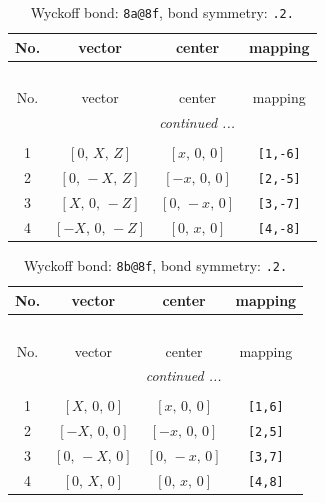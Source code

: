 \documentclass[fleqn,8pt]{jsarticle}
\begin{document}
\begin{longtable}{cccc}
\caption{Wyckoff bond: {\tt 8a@8f}, bond symmetry: {\tt .2.}}
 \\
 \hline \hline
No. & vector & center & mapping \\ \hline \endfirsthead

\multicolumn{3}{l}{\tablename\ \thetable{}} \\
 \hline \hline
No. & vector & center & mapping \\ \hline \endhead

 \hline \hline
\multicolumn{3}{r}{\footnotesize\it continued ...} \\ \endfoot

 \hline \hline
\multicolumn{3}{r}{} \\ \endlastfoot

1 & $\left[ 0,\, X,\, Z \right]$ & $\left[ x,\, 0,\, 0 \right]$ & {\tt [1,-6]} \\ \hline
2 & $\left[ 0,\, - X,\, Z \right]$ & $\left[ - x,\, 0,\, 0 \right]$ & {\tt [2,-5]} \\ \hline
3 & $\left[ X,\, 0,\, - Z \right]$ & $\left[ 0,\, - x,\, 0 \right]$ & {\tt [3,-7]} \\ \hline
4 & $\left[ - X,\, 0,\, - Z \right]$ & $\left[ 0,\, x,\, 0 \right]$ & {\tt [4,-8]} \\
\end{longtable}
\renewcommand{\arraystretch}{1.2}
\begin{longtable}{cccc}
\caption{Wyckoff bond: {\tt 8b@8f}, bond symmetry: {\tt .2.}}
 \\
 \hline \hline
No. & vector & center & mapping \\ \hline \endfirsthead

\multicolumn{3}{l}{\tablename\ \thetable{}} \\
 \hline \hline
No. & vector & center & mapping \\ \hline \endhead

 \hline \hline
\multicolumn{3}{r}{\footnotesize\it continued ...} \\ \endfoot

 \hline \hline
\multicolumn{3}{r}{} \\ \endlastfoot

1 & $\left[ X,\, 0,\, 0 \right]$ & $\left[ x,\, 0,\, 0 \right]$ & {\tt [1,6]} \\ \hline
2 & $\left[ - X,\, 0,\, 0 \right]$ & $\left[ - x,\, 0,\, 0 \right]$ & {\tt [2,5]} \\ \hline
3 & $\left[ 0,\, - X,\, 0 \right]$ & $\left[ 0,\, - x,\, 0 \right]$ & {\tt [3,7]} \\ \hline
4 & $\left[ 0,\, X,\, 0 \right]$ & $\left[ 0,\, x,\, 0 \right]$ & {\tt [4,8]} \\
\end{longtable}
\end{document}
